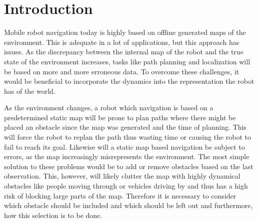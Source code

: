 \chapter{Introduction}

Mobile robot navigation today is highly based on offline generated maps of the environment. 
This is adequate in a lot of applications, but this approach has issues. 
As the discrepancy between the internal map of the robot and the true state of the environment increases, tasks like path planning and localization will be based on more and more erroneous data. 
To overcome these challenges, it would be beneficial to incorporate the dynamics into the representation the robot has of the world.

As the environment changes, a robot which navigation is based on a predetermined static map will be prone to plan paths where there might be placed an obstacle since the map was generated and the time of planning. 
This will force the robot to replan the path thus wasting time or causing the robot to fail to reach its goal. Likewise will a static map based navigation be subject to errors, as the map increasingly misrepresents the environment. 
The most simple solution to these problems would be to add or remove obstacles based on the last observation. This, however, will likely clutter the map with highly dynamical obstacles like people moving through or vehicles driving by and thus has a high risk of blocking large parts of the map. 
Therefore it is necessary to consider which obstacle should be included and which should be left out and furthermore, how this selection is to be done.

